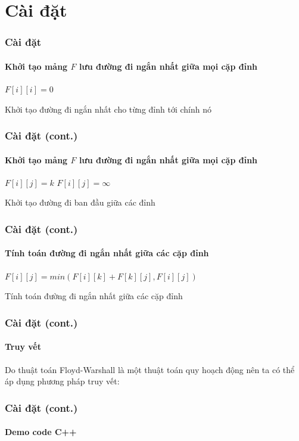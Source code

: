 \documentclass[12pt]{beamer}
\begin{document}
    \section{Cài đặt}
    \begin{frame}[t]
        \frametitle{Cài đặt}
        \framesubtitle{Khởi tạo mảng $F$ lưu đường đi ngắn nhất giữa mọi cặp đỉnh}
        \begin{algorithm}[H]
            \begin{algorithmic}[1]
                    \STATE $F[i][i] = 0$
                \ENDFOR
            \end{algorithmic}
            \caption{Khởi tạo đường đi ngắn nhất cho từng đỉnh tới chính nó}
        \end{algorithm}
    \end{frame}
    \begin{frame}[t]
        \frametitle{Cài đặt (cont.)}
        \framesubtitle{Khởi tạo mảng $F$ lưu đường đi ngắn nhất giữa mọi cặp đỉnh}
        \begin{algorithm}[H]
            \begin{algorithmic}[1]
                \STATE $F[i][j] = k$
                \ELSE
                \STATE $F[i][j] = \infty$
                \ENDIF
                \ENDIF
                \ENDFOR
                \ENDFOR
            \end{algorithmic}
            \caption{Khởi tạo đường đi ban đầu giữa các đỉnh}
        \end{algorithm}
    \end{frame}
    \begin{frame}[t]
        \frametitle{Cài đặt (cont.)}
        \framesubtitle{Tính toán đường đi ngắn nhất giữa các cặp đỉnh}
        \begin{algorithm}[H]
            \begin{algorithmic}[1]
                \STATE $F[i][j] = min(F[i][k] + F[k][j], F[i][j])$
                \ENDFOR
                \ENDFOR
                \ENDFOR
            \end{algorithmic}
            \caption{Tính toán đường đi ngắn nhất giữa các cặp đỉnh}
            \label{alg:seq}
        \end{algorithm}
    \end{frame}
    \begin{frame}[t]
        \frametitle{Cài đặt (cont.)}
        \framesubtitle{Truy vết}
        Do thuật toán Floyd-Warshall là một thuật toán quy hoạch động nên ta có thể áp dụng phương pháp truy vết:
    \end{frame}
    \begin{frame}
        \frametitle{Cài đặt (cont.)}
        \framesubtitle{Demo code C++}
    \end{frame}
\end{document}
